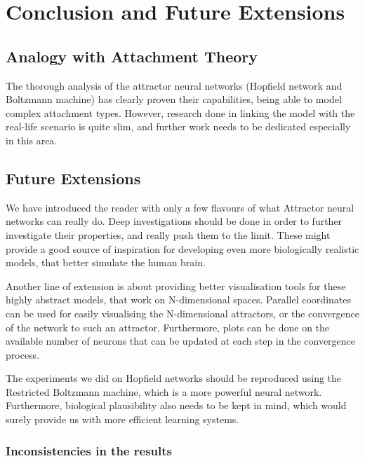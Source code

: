 \chapter{Conclusion and Future Extensions}

\section{Analogy with Attachment Theory}

The thorough analysis of the attractor neural networks (Hopfield network and Boltzmann machine) has clearly proven their capabilities, being able to model complex attachment types. However, research done in linking the model with the real-life scenario is quite slim, and further work needs to be dedicated especially in this area.

\section{Future Extensions}

We have introduced the reader with only a few flavours of what Attractor neural networks can really do. Deep investigations should be done in order to further investigate their properties, and really push them to the limit. These might provide a good source of inspiration for developing even more biologically realistic models, that better simulate the human brain.

Another line of extension is about providing better visualisation tools for these highly abstract models, that work on N-dimensional spaces. Parallel coordinates can be used for easily visualising the N-dimensional attractors, or the convergence of the network to such an attractor. Furthermore, plots can be done on the available number of neurons that can be updated at each step in the convergence process.

The experiments we did on Hopfield networks should be reproduced using the Restricted Boltzmann machine, which is a more powerful neural network. Furthermore, biological plausibility also needs to be kept in mind, which would surely provide us with more efficient learning systems.

\subsection{Inconsistencies in the results}
\label{inconsistencies}

